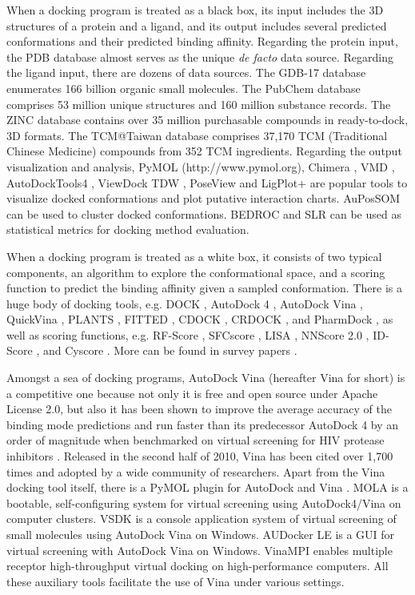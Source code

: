 When a docking program is treated as a black box, its input includes the 3D structures of a protein and a ligand, and its output includes several predicted conformations and their predicted binding affinity. Regarding the protein input, the PDB database \citep{539,537} almost serves as the unique \textit{de facto} data source. Regarding the ligand input, there are dozens of data sources. The GDB-17 database \citep{1276} enumerates 166 billion organic small molecules. The PubChem database \citep{526} comprises 53 million unique structures and 160 million substance records. The ZINC database \citep{532,1178} contains over 35 million purchasable compounds in ready-to-dock, 3D formats. The TCM@Taiwan database \citep{528} comprises 37,170 TCM (Traditional Chinese Medicine) compounds from 352 TCM ingredients. Regarding the output visualization and analysis, PyMOL (http://www.pymol.org), Chimera \citep{1219}, VMD \citep{1220}, AutoDockTools4 \citep{596}, ViewDock TDW \citep{559}, PoseView \citep{748} and LigPlot+ \citep{951} are popular tools to visualize docked conformations and plot putative interaction charts. AuPosSOM \citep{598} can be used to cluster docked conformations. BEDROC \citep{490} and SLR \citep{489} can be used as statistical metrics for docking method evaluation.

When a docking program is treated as a white box, it consists of two typical components, an algorithm to explore the conformational space, and a scoring function to predict the binding affinity given a sampled conformation. There is a huge body of docking tools, e.g. DOCK \citep{1222,1445}, AutoDock 4 \citep{596}, AutoDock Vina \citep{595}, QuickVina \citep{1193}, PLANTS \citep{610,607,779}, FITTED \citep{602,603}, CDOCK \citep{1224}, CRDOCK \citep{1200}, and PharmDock \citep{1376}, as well as scoring functions, e.g. RF-Score \citep{564,1370}, SFCscore \citep{581,1347}, LISA \citep{775}, NNScore 2.0 \citep{977}, ID-Score \cite{1305}, and Cyscore \cite{1372}. More can be found in survey papers \citep{493,922}.

Amongst a sea of docking programs, AutoDock Vina \citep{595} (hereafter Vina for short) is a competitive one because not only it is free and open source under Apache License 2.0, but also it has been shown to improve the average accuracy of the binding mode predictions \citep{595} and run faster than its predecessor AutoDock 4 \citep{596} by an order of magnitude when benchmarked on virtual screening for HIV protease inhibitors \citep{556}. Released in the second half of 2010, Vina has been cited over 1,700 times and adopted by a wide community of researchers. Apart from the Vina docking tool itself, there is a PyMOL plugin for AutoDock and Vina \citep{609}. MOLA \citep{773} is a bootable, self-configuring system for virtual screening using AutoDock4/Vina on computer clusters. VSDK \citep{1268} is a console application system of virtual screening of small molecules using AutoDock Vina on Windows. AUDocker LE \citep{1250} is a GUI for virtual screening with AutoDock Vina on Windows. VinaMPI \citep{1329} enables multiple receptor high-throughput virtual docking on high-performance computers. All these auxiliary tools facilitate the use of Vina under various settings.

